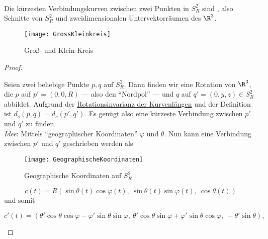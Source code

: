 \begin{lemma}
  \  \\
  \begin{minipage}{.45\textwidth}
    Die kürzesten Verbindungskurven zwischen zwei Punkten in \( S^2_R \) sind , also Schnitte von \( S^2_R \) und zweidimensionalen Untervektorräumen des \( \R^3 \).
  \end{minipage}
  \hfill
  \begin{minipage}{.45\textwidth}
    \begin{figure}[H]
      \texttt{[image: GrossKleinkreis]}
      \caption{Groß- und Klein-Kreis}
    \end{figure}
  \end{minipage}
  \begin{proof}
    \  \\
    \begin{minipage}{.45\textwidth}
      Seien zwei beliebige Punkte \( p,q \) auf \( S^2_R \). Dann finden wir eine Rotation von \( \R^3 \), die \( p \) auf \( p' = (0,0,R) \) --- also den ``Nordpol'' --- und \( q \) auf \( q' = (0,y,z) \in S^2_R \) abbildet. Aufgrund der \hyperref[lemma:kurvenlaengen]{Rotationsinvarianz der Kurvenlängen} und der Definition ist \( d_s(p,q) = d_s(p', q') \). Es genügt also eine kürzeste Verbindung zwischen \( p' \) und \( q' \) zu finden. \\
      \emph{Idee}: Mittels ``geographischer Koordinaten'' \( \varphi \) und \( \theta \). Nun kann eine Verbindung zwischen \( p' \) und \( q' \) geschrieben werden als
    \end{minipage}
    \hfill
    \begin{minipage}{.45\textwidth}
      \begin{figure}[H]
        \texttt{[image: GeographischeKoordinaten]}
        \caption{Geographische Koordinaten auf \( S_R^2 \)}
      \end{figure}
    \end{minipage}
    \begin{equation*}
      c(t) = R(\sin\theta(t)\cos\varphi(t), \ \sin\theta(t)\sin\varphi(t), \ \cos\theta(t))
    \end{equation*}
    und somit
    \begin{small}
      \begin{equation*}
        c'(t) = (\theta'\cos\theta\cos\varphi-\varphi'\sin\theta\sin\varphi, \ \theta'\cos\theta\sin\varphi+\varphi'\sin\theta\cos\varphi, \ -\theta'\sin\theta)\text{,}

\end{equation*}
\end{small}
\end{proof}
\end{lemma}
